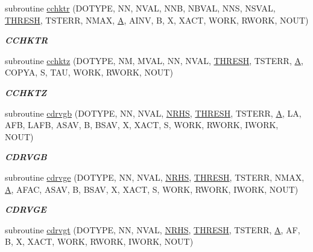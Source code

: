 \begin{DoxyCompactItemize}
subroutine \hyperlink{group__complex__lin_ga9c171190ac912eac5e43f21f860daebc}{cchktr} (D\+O\+T\+Y\+P\+E, N\+N, N\+V\+A\+L, N\+N\+B, N\+B\+V\+A\+L, N\+N\+S, N\+S\+V\+A\+L, \hyperlink{zlaqgs_8c_a0656018abfc9fa2821827415f5d5ea57}{T\+H\+R\+E\+S\+H}, T\+S\+T\+E\+R\+R, N\+M\+A\+X, \hyperlink{classA}{A}, A\+I\+N\+V, B, X, X\+A\+C\+T, W\+O\+R\+K, R\+W\+O\+R\+K, N\+O\+U\+T)
\begin{DoxyCompactList}\small\item\em {\bfseries C\+C\+H\+K\+T\+R} \end{DoxyCompactList}\item 
subroutine \hyperlink{group__complex__lin_ga6b285e3447db7ae6cad9c9fb62e93614}{cchktz} (D\+O\+T\+Y\+P\+E, N\+M, M\+V\+A\+L, N\+N, N\+V\+A\+L, \hyperlink{zlaqgs_8c_a0656018abfc9fa2821827415f5d5ea57}{T\+H\+R\+E\+S\+H}, T\+S\+T\+E\+R\+R, \hyperlink{classA}{A}, C\+O\+P\+Y\+A, S, T\+A\+U, W\+O\+R\+K, R\+W\+O\+R\+K, N\+O\+U\+T)
\begin{DoxyCompactList}\small\item\em {\bfseries C\+C\+H\+K\+T\+Z} \end{DoxyCompactList}\item 
subroutine \hyperlink{group__complex__lin_gaa954e14d658934d1d48cfadebfaed000}{cdrvgb} (D\+O\+T\+Y\+P\+E, N\+N, N\+V\+A\+L, \hyperlink{example__user_8c_aa0138da002ce2a90360df2f521eb3198}{N\+R\+H\+S}, \hyperlink{zlaqgs_8c_a0656018abfc9fa2821827415f5d5ea57}{T\+H\+R\+E\+S\+H}, T\+S\+T\+E\+R\+R, \hyperlink{classA}{A}, L\+A, A\+F\+B, L\+A\+F\+B, A\+S\+A\+V, B, B\+S\+A\+V, X, X\+A\+C\+T, S, W\+O\+R\+K, R\+W\+O\+R\+K, I\+W\+O\+R\+K, N\+O\+U\+T)
\begin{DoxyCompactList}\small\item\em {\bfseries C\+D\+R\+V\+G\+B} \end{DoxyCompactList}\item 
subroutine \hyperlink{group__complex__lin_ga176a27bb98a819802b649ec79797ce53}{cdrvge} (D\+O\+T\+Y\+P\+E, N\+N, N\+V\+A\+L, \hyperlink{example__user_8c_aa0138da002ce2a90360df2f521eb3198}{N\+R\+H\+S}, \hyperlink{zlaqgs_8c_a0656018abfc9fa2821827415f5d5ea57}{T\+H\+R\+E\+S\+H}, T\+S\+T\+E\+R\+R, N\+M\+A\+X, \hyperlink{classA}{A}, A\+F\+A\+C, A\+S\+A\+V, B, B\+S\+A\+V, X, X\+A\+C\+T, S, W\+O\+R\+K, R\+W\+O\+R\+K, I\+W\+O\+R\+K, N\+O\+U\+T)
\begin{DoxyCompactList}\small\item\em {\bfseries C\+D\+R\+V\+G\+E} \end{DoxyCompactList}\item 
subroutine \hyperlink{group__complex__lin_ga2d766c7c08c027eb04dbdd4c3656a99b}{cdrvgt} (D\+O\+T\+Y\+P\+E, N\+N, N\+V\+A\+L, \hyperlink{example__user_8c_aa0138da002ce2a90360df2f521eb3198}{N\+R\+H\+S}, \hyperlink{zlaqgs_8c_a0656018abfc9fa2821827415f5d5ea57}{T\+H\+R\+E\+S\+H}, T\+S\+T\+E\+R\+R, \hyperlink{classA}{A}, A\+F, B, X, X\+A\+C\+T, W\+O\+R\+K, R\+W\+O\+R\+K, I\+W\+O\+R\+K, N\+O\+U\+T)

\end{DoxyCompactItemize}

